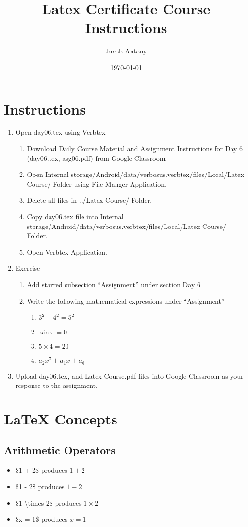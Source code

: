 \documentclass{article}
\title{Latex Certificate Course Instructions}
\author{Jacob Antony}
\date{\today}
\begin{document}
\maketitle

\section*{Instructions}
\begin{enumerate}
	\item Open day06.tex using Verbtex
	\begin{enumerate}
		\item Download Daily Course Material and Assignment Instructions for Day 6 (day06.tex, asg06.pdf) from Google Classroom.
		\item Open Internal storage/Android/data/verbosus.verbtex/files/Local/Latex Course/ Folder using File Manger Application.
		\item Delete all files in ../Latex Course/ Folder.
		\item Copy day06.tex file into Internal storage/Android/data/verbosus.verbtex/files/Local/Latex Course/  Folder.
		\item Open Verbtex Application.
	\end{enumerate}
	\item Exercise
	\begin{enumerate}
		\item Add starred subsection ``Assignment'' under section Day 6
		\item Write the following mathematical expressions under ``Assignment''
		\begin{enumerate}
			\item $3^2+4^2=5^2$
			\item $\sin \pi = 0$
			\item $5 \times 4 = 20$
			\item $a_2x^2 + a_1x+a_0$
		\end{enumerate}
	\end{enumerate}
	\item Upload day06.tex, and Latex Course.pdf files into Google Classroom as your response to the assignment.
\end{enumerate}

\section{\LaTeX{} Concepts}

\subsection{Arithmetic Operators}
\begin{itemize}
	\item \$1 + 2\$ produces $1 + 2$
	\item \$1 - 2\$ produces $1 - 2$
	\item \$1 \textbackslash{}times 2\$ produces $1 \times 2$
	\item \$x = 1\$ produces $x = 1$
\end{itemize}
\end{document}
